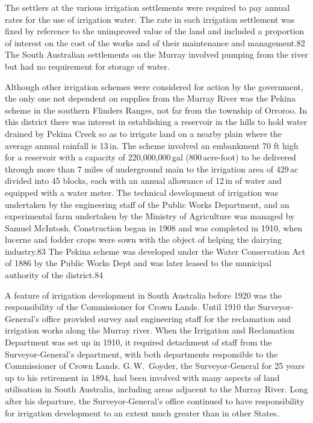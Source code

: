 The settlers at the various irrigation settlements were required to
pay annual rates for the use of irrigation water.  The rate in each
irrigation settlement was fixed by reference to the unimproved value
of the land and included a proportion of interest on the cost of the
works and of their maintenance and management.82 The South Australian
settlements on the Murray involved pumping from the river but had no
requirement for storage of water.

Although other irrigation schemes were considered for action by the
government, the only one not dependent on supplies from the Murray
River was the Pekina scheme in the southern Flinders Ranges, not far
from the township of Orroroo.  In this district there was interest in
establishing a reservoir in the hills to hold water drained by Pekina
Creek so as to irrigate land on a nearby plain where the average
annual rainfall is 13\,in.  The scheme involved an embankment 70 ft
high for a reservoir with a capacity of 220,000,000\,gal
(800\,acre-foot) to be delivered through more than 7 miles of
underground main to the irrigation area of 429\,ac divided into 45
blocks, each with an annual allowance of 12\,in of water and equipped
with a water meter.  The technical development of irrigation was
undertaken by the engineering staff of the Public Works Department,
and an experimental farm undertaken by the Ministry of Agriculture was
managed by Samuel McIntosh.  Construction began in 1908 and was
completed in 1910, when lucerne and fodder crops were sown with the
object of helping the dairying industry.83 The Pekina scheme was
developed under the Water Conservation Act of 1886 by the Public Works
Dept and was later leased to the municipal authority of the
district.84

A feature of irrigation development in South Australia before 1920 was
the responsibility of the Commissioner for Crown Lands.  Until 1910
the Surveyor-General's office provided survey and engineering staff
for the reclamation and irrigation works along the Murray river.  When
the Irrigation and Reclamation Department was set up in 1910, it
required detachment of staff from the Surveyor-General's department,
with both departments responsible to the Commissioner of Crown Lands.
G.\,W.~Goyder, the Surveyor-General for 25 years up to his retirement
in 1894, had been involved with many aspects of land utilisation in
South Australia, including areas adjacent to the Murray River.  Long
after his departure, the Surveyor-General's office continued to have
responsibility for irrigation development to an extent much greater
than in other States.

